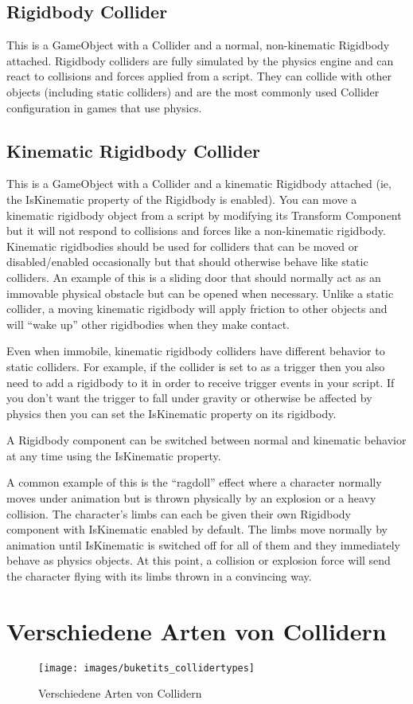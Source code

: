 \subsection{Rigidbody Collider}
This is a GameObject with a Collider and a normal, non-kinematic Rigidbody attached. Rigidbody colliders are fully simulated by the physics engine and can react to collisions and forces applied from a script. They can collide with other objects (including static colliders) and are the most commonly used Collider configuration in games that use physics.

\subsection{Kinematic Rigidbody Collider}
This is a GameObject with a Collider and a kinematic Rigidbody attached (ie, the IsKinematic property of the Rigidbody is enabled). You can move a kinematic rigidbody object from a script by modifying its Transform Component
but it will not respond to collisions and forces like a non-kinematic rigidbody. Kinematic rigidbodies should be used for colliders that can be moved or disabled/enabled occasionally but that should otherwise behave like static colliders. An example of this is a sliding door that should normally act as an immovable physical obstacle but can be opened when necessary. Unlike a static collider, a moving kinematic rigidbody will apply friction to other objects and will “wake up” other rigidbodies when they make contact.

Even when immobile, kinematic rigidbody colliders have different behavior to static colliders. For example, if the collider is set to as a trigger then you also need to add a rigidbody to it in order to receive trigger events in your script. If you don’t want the trigger to fall under gravity or otherwise be affected by physics then you can set the IsKinematic property on its rigidbody.

A Rigidbody component can be switched between normal and kinematic behavior at any time using the IsKinematic property.

A common example of this is the “ragdoll” effect where a character normally moves under animation but is thrown physically by an explosion or a heavy collision. The character’s limbs can each be given their own Rigidbody component with IsKinematic enabled by default. The limbs move normally by animation until IsKinematic is switched off for all of them and they immediately behave as physics objects. At this point, a collision or explosion force will send the character flying with its limbs thrown in a convincing way.
\cite{_staticCollider}

\section{Verschiedene Arten von Collidern}

\begin{figure}[h]
	\centering
	\texttt{[image: images/buketits\_collidertypes]}
	\caption{Verschiedene Arten von Collidern}
\end{figure}
\cite{dickinson2015unity}